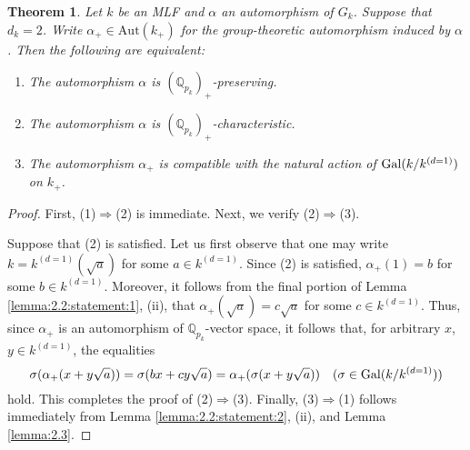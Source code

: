 \documentclass[12pt,showkeys]{amsart}
\theoremstyle{theorem}
\newtheorem{theorem}{Theorem}[section]
\theoremstyle{definition}
\def\bQ{{\mathbb Q}}
\begin{document}
\begin{theorem}\label{theorem:2.4}
Let $k$ be an MLF and $\alpha$ an automorphism of $G_k$. Suppose that $d_k = 2$. Write $\alpha_+ \in \mathrm{Aut}(k_+)$ for the group-theoretic automorphism induced by $\alpha$. Then the following are equivalent: 
   \begin{enumerate}[label=(\arabic*),ref=(\arabic*)]
   	\item[\rm (1)] The automorphism $\alpha$ is $(\bQ_{p_k})_+$-preserving. \label{theorem:2.4:statement:1}
   	\item[\rm (2)] The automorphism $\alpha$ is $(\bQ_{p_k})_+$-characteristic. \label{theorem:2.4:statement:2}
   	\item[\rm (3)] The automorphism $\alpha_{+}$ is compatible with the natural action of ${\rm Gal} (k/k^{(d=1)})$ on $k_{+}$. \label{theorem:2.4:statement:3}
   \end{enumerate}

\end{theorem}

\begin{proof}
First, (1)$\Longrightarrow$(2) is immediate. Next, we verify (2)$\Longrightarrow$(3). 
\begin{comment}
We can write $k=k^{(d=1)}(\sqrt{a})$ for some a $\in k^{(d=1)}$. Since assertion (ii) holds and $\alpha_{+}$ is a isomorphism of $\bQ_{p_k}$-vector spaces, $\alpha_{+}(x+y \sqrt{a}) = x + y'\sqrt{a}$ for some $y' \in k^{(d=1)}$. Thus, $\sigma( \alpha_{+}(x+y \sqrt{a}) ) = \sigma(x + y'\sqrt{a} ) = x - y'\sqrt{a} = \alpha(\sigma(x+y\sqrt{a}))$. This completes the proof of (2)$\Longrightarrow$(3). 
\end{comment}
Suppose that (2) is satisfied.  Let us first observe that one may write $k = k^{(d=1)}(\sqrt{a})$ for some $a \in k^{(d=1)}$.  Since (2) is satisfied, $\alpha_+(1) = b$ for some $b \in k^{(d=1)}$.  Moreover, it follows from the final portion of Lemma \ref{lemma:2.2:statement:1}, (ii), that $\alpha_+(\sqrt{a}) = c \sqrt{a}$ for some $c \in k^{(d=1)}$. Thus, since $\alpha_+$ is an automorphism of $\bQ_{p_k}$-vector space, it follows that, for arbitrary $x$, $y \in k^{(d=1)}$, the equalities 
\[
\sigma(\alpha_{+}(x+y \sqrt{a})) = \sigma(bx + cy\sqrt{a}) =  \alpha_+(\sigma(x+y\sqrt{a})) \ \ \ (\sigma \in {\rm Gal}(k/k^{(d=1)}))
\]
hold. This completes the proof of (2)$\Longrightarrow$(3). 
Finally, (3)$\Longrightarrow$(1) follows immediately from Lemma \ref{lemma:2.2:statement:2}, (ii), and Lemma \ref{lemma:2.3}. 
\end{proof}
\end{document}
